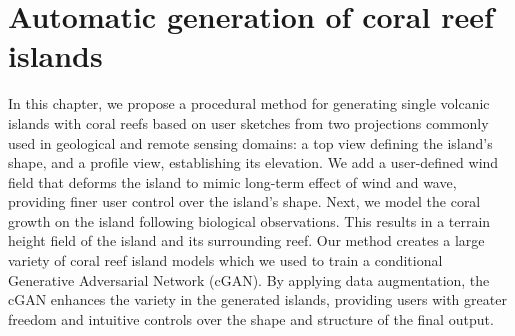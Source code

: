 \resetgraphicspath
{}

\chapter{Automatic generation of coral reef islands}
\label{chap:coral-island}

\abstract
In this chapter, we propose a procedural method for generating single volcanic islands with coral reefs based on user sketches from two projections commonly used in geological and remote sensing domains: a top view defining the island's shape, and a profile view, establishing its elevation. 
We add a user-defined wind field that deforms the island to mimic long-term effect of wind and wave, providing finer user control over the island's shape.
Next, we model the coral growth on the island following biological observations.
This results in a terrain height field of the island and its surrounding reef. 
Our method creates a large variety of coral reef island models which we used to train a conditional Generative Adversarial Network (cGAN). 
By applying data augmentation, the cGAN enhances the variety in the generated islands, providing users with greater freedom and intuitive controls over the shape and structure of the final output.
\pagebreak

\minitoc

